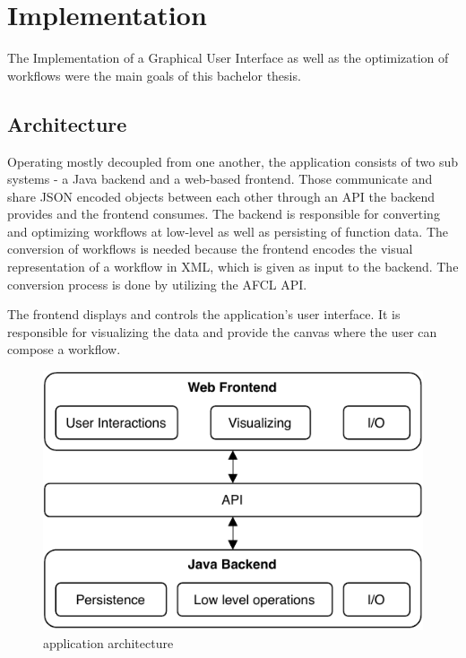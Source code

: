 \documentclass[a4paper,11pt,pdftex,halfparskip,cleardoubleempty,bibtotoc,liststotoc]{scrbook}
\begin{document}
\chapter{Implementation}


The Implementation of a Graphical User Interface as well as the optimization of workflows were the main goals of this bachelor thesis.


\section{Architecture}


Operating mostly decoupled from one another, the application  consists of two sub systems - a Java backend and a web-based frontend. Those communicate and share JSON encoded objects between each other through an API the backend provides and the frontend consumes. The backend is responsible for converting and optimizing workflows at low-level as well as persisting of function data. The conversion of workflows is needed because the frontend encodes the visual representation of a workflow in XML, which is given as input to the backend. The conversion process is done by utilizing the AFCL API. 

The frontend displays and controls the application's user interface. It is responsible for visualizing the data and provide the canvas where the user can compose a workflow.

\begin{figure}[H]
  \centering
  \vspace{0.8cm}
  \includegraphics[scale=0.8]{architecture}
  \caption{application architecture}
\end{figure}
\end{document}
